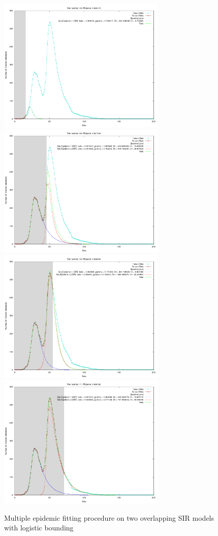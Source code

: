 \begin{centering}
\begin{figure}[h!]
  \includegraphics[width=8cm]{images/multi/sirsir6.png}
  \includegraphics[width=8cm]{images/multi/sirsir7.png}
  \includegraphics[width=8cm]{images/multi/sirsir8.png}
  \includegraphics[width=8cm]{images/multi/sirsir9.png}
  \caption{Multiple epidemic fitting procedure on two overlapping SIR
    models with logistic bounding}
\label{fig:sirsir2}
  \end{figure}
\end{centering}


